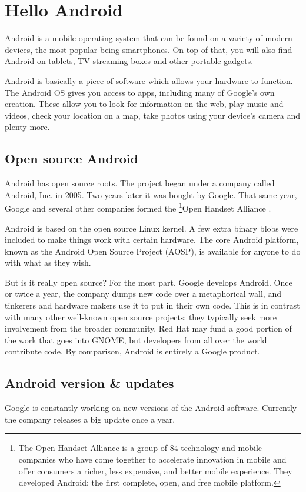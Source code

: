 
\chapter{Hello Android}
Android\cite{Todd2017} is a mobile operating system that can be found on a variety of modern devices, the most popular being smartphones.
On top of that, you will also find Android on tablets, TV streaming boxes and other portable gadgets.

Android is basically a piece of software which allows your hardware to function.
The Android OS gives you access to apps, including many of Google's own creation.
These allow you to look for information on the web, play music and videos, check your location on a map, take photos using your device's camera and plenty more.

\section{Open source Android}
Android has open source roots.
The project began under a company called Android, Inc. in 2005. Two years later it was bought by Google.
That same year, Google and several other companies formed the \footnote{The Open Handset Alliance is a group of 84 technology and mobile companies who have come together to accelerate innovation in mobile and offer consumers a richer, less expensive, and better mobile experience.
They developed Android: the first complete, open, and free mobile platform.}{Open Handset Alliance} \cite{alliance}.

Android is based on the open source Linux kernel. A few extra binary blobs were included to make things work with certain hardware.
The core Android platform, known as the Android Open Source Project (AOSP), is available for anyone to do with what as they wish.

But is it really open source?
For the most part, Google develops Android.
Once or twice a year, the company dumps new code over a metaphorical wall, and tinkerers and hardware makers use it to put in their own code.
This is in contrast with many other well-known open source projects: they typically seek more involvement from the broader community.
Red Hat may fund a good portion of the work that goes into GNOME, but developers from all over the world contribute code.
By comparison, Android is entirely a Google product.

\section{Android version \& updates}
Google is constantly working on new versions of the Android software.
Currently the company releases a big update once a year.

